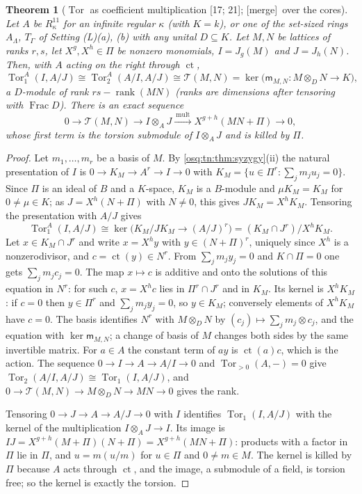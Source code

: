 \documentclass[11pt,letterpaper]{article}
\numberwithin{equation}{section}
\newtheorem{theorem}{Theorem}[section]
\theoremstyle{definition}
\theoremstyle{remark}
\theoremstyle{plain}
\newcommand{\ct}{\operatorname{ct}}
\newcommand{\Frac}{\operatorname{Frac}}
\newcommand{\Tor}{\operatorname{Tor}}
\newcommand{\rk}{\operatorname{rank}}
\newcommand{\src}[1]{\textup{\textsf{[#1]}}}
\newcommand{\merge}{\textup{\textsf{[merge]}}}
\begin{document}
\begin{theorem}[$\Tor$ as coefficient multiplication \src{17; 21}; \merge\ over the cores]\label{osq:rel:thm:tor}
Let $A$ be $R^{11}_\kappa$ for an infinite regular $\kappa$ (with $K=k$), or one of the set-sized rings $A_\Lambda$, $T_\Gamma$ of
Setting (L)(a), (b) with any unital $D\subseteq K$. Let $M,N$ be lattices of ranks $r,s$, let $X^g,X^h\in\Pi$ be nonzero monomials,
$I=J_g(M)$ and $J=J_h(N)$. Then, with $A$ acting on the right through $\ct$,
\[
 \Tor^A_1(I,A/J)\cong\Tor^A_2(A/I,A/J)\cong\mathcal T(M,N)=\ker\bigl(\mathsf m_{M,N}:M\otimes_DN\to K\bigr),
\]
a $D$-module of rank $rs-\rk(MN)$ (ranks are dimensions after tensoring with $\Frac D$). There is an exact sequence
\[
 0\longrightarrow\mathcal T(M,N)\longrightarrow I\otimes_AJ\xrightarrow{\ \text{mult}\ }X^{g+h}(MN+\Pi)\longrightarrow0,
\]
whose first term is the torsion submodule of $I\otimes_AJ$ and is killed by $\Pi$.
\end{theorem}
\begin{proof}
Let $m_1,\dots,m_r$ be a basis of $M$. By \cref{osq:tn:thm:syzygy}(ii) the natural presentation of $I$ is
$0\to K_M\to A^r\to I\to0$ with $K_M=\{u\in\Pi^r:\sum_jm_ju_j=0\}$. Since $\Pi$ is an ideal of $B$ and a $K$-space, $K_M$ is a
$B$-module and $\mu K_M=K_M$ for $0\ne\mu\in K$; as $J=X^h(N+\Pi)$ with $N\ne0$, this gives $JK_M=X^hK_M$. Tensoring the presentation
with $A/J$ gives
\[
 \Tor^A_1(I,A/J)\cong\ker\bigl(K_M/JK_M\to(A/J)^r\bigr)=(K_M\cap J^r)/X^hK_M .
\]
Let $x\in K_M\cap J^r$ and write $x=X^hy$ with $y\in(N+\Pi)^r$, uniquely since $X^h$ is a nonzerodivisor, and $c=\ct(y)\in N^r$. From
$\sum_jm_jy_j=0$ and $K\cap\Pi=0$ one gets $\sum_jm_jc_j=0$. The map $x\mapsto c$ is additive and onto the solutions of this equation
in $N^r$: for such $c$, $x=X^hc$ lies in $\Pi^r\cap J^r$ and in $K_M$. Its kernel is $X^hK_M$: if $c=0$ then $y\in\Pi^r$ and
$\sum_jm_jy_j=0$, so $y\in K_M$; conversely elements of $X^hK_M$ have $c=0$. The basis identifies $N^r$ with $M\otimes_DN$ by
$(c_j)\mapsto\sum_jm_j\otimes c_j$, and the equation with $\ker\mathsf m_{M,N}$; a change of basis of $M$ changes both sides by the same
invertible matrix. For $a\in A$ the constant term of $ay$ is $\ct(a)c$, which is the action. The sequence $0\to I\to A\to A/I\to0$ and
$\Tor_{>0}(A,-)=0$ give $\Tor_2(A/I,A/J)\cong\Tor_1(I,A/J)$, and $0\to\mathcal T(M,N)\to M\otimes_DN\to MN\to0$ gives the rank.

Tensoring $0\to J\to A\to A/J\to0$ with $I$ identifies $\Tor_1(I,A/J)$ with the kernel of the multiplication $I\otimes_AJ\to I$. Its
image is $IJ=X^{g+h}(M+\Pi)(N+\Pi)=X^{g+h}(MN+\Pi)$: products with a factor in $\Pi$ lie in $\Pi$, and $u=m(u/m)$ for $u\in\Pi$ and
$0\ne m\in M$. The kernel is killed by $\Pi$ because $A$ acts through $\ct$, and the image, a submodule of a field, is torsion free;
so the kernel is exactly the torsion.
\end{proof}
\end{document}
